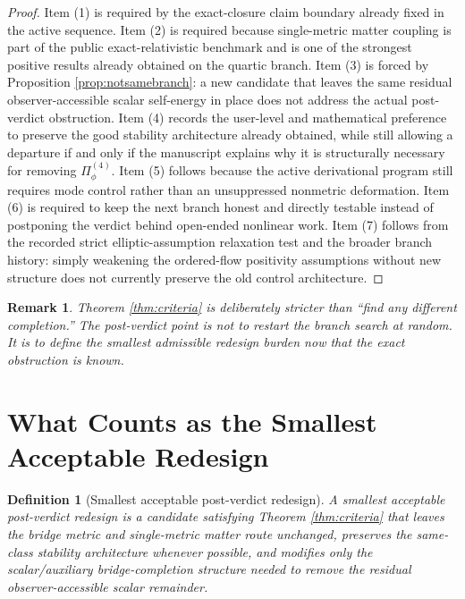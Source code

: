 \documentclass[11pt]{article}
\newtheorem{definition}{Definition}
\newtheorem{remark}{Remark}
\begin{document}
\begin{proof}
Item (1) is required by the exact-closure claim boundary already fixed in the active sequence. Item (2) is required because single-metric matter coupling is part of the public exact-relativistic benchmark and is one of the strongest positive results already obtained on the quartic branch. Item (3) is forced by Proposition \ref{prop:notsamebranch}: a new candidate that leaves the same residual observer-accessible scalar self-energy in place does not address the actual post-verdict obstruction. Item (4) records the user-level and mathematical preference to preserve the good stability architecture already obtained, while still allowing a departure if and only if the manuscript explains why it is structurally necessary for removing \(\Pi_\phi^{(4)}\). Item (5) follows because the active derivational program still requires mode control rather than an unsuppressed nonmetric deformation. Item (6) is required to keep the next branch honest and directly testable instead of postponing the verdict behind open-ended nonlinear work. Item (7) follows from the recorded strict elliptic-assumption relaxation test and the broader branch history: simply weakening the ordered-flow positivity assumptions without new structure does not currently preserve the old control architecture.
\end{proof}

\begin{remark}
Theorem \ref{thm:criteria} is deliberately stricter than ``find any different completion.'' The post-verdict point is not to restart the branch search at random. It is to define the smallest admissible redesign burden now that the exact obstruction is known.
\end{remark}

\section{What Counts as the Smallest Acceptable Redesign}

\begin{definition}[Smallest acceptable post-verdict redesign]
\label{def:smallest}
A \emph{smallest acceptable post-verdict redesign} is a candidate satisfying Theorem \ref{thm:criteria} that leaves the bridge metric and single-metric matter route unchanged, preserves the same-class stability architecture whenever possible, and modifies only the scalar/auxiliary bridge-completion structure needed to remove the residual observer-accessible scalar remainder.
\end{definition}
\end{document}
